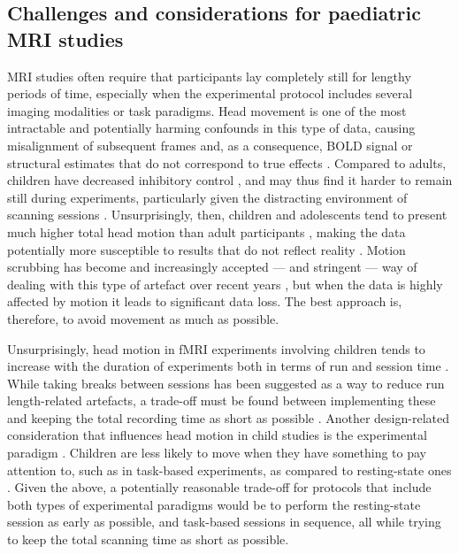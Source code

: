 \subsection{Challenges and considerations for paediatric MRI studies}


MRI studies often require that participants lay completely still for lengthy periods of time, especially when the experimental protocol includes several imaging modalities or task paradigms. Head movement is one of the most intractable and potentially harming confounds in this type of data, causing misalignment of subsequent frames and, as a consequence, BOLD signal or structural estimates that do not correspond to true effects \citep{Friston1996,Siegel2017}. Compared to adults, children have decreased inhibitory control \citep{Bedard2002}, and may thus find it harder to remain still during experiments, particularly  given the distracting environment of scanning sessions \citep{Greene2016}. Unsurprisingly, then, children and adolescents tend to present much higher total head motion than adult participants \citep{Satterthwaite2013b}, making the data potentially more susceptible to results that do not reflect reality \citep{Power2012}. Motion scrubbing has become and increasingly accepted --- and stringent --- way of dealing with this type of artefact over recent years \citep{Power2014a,Laumann2016}, but when the data is highly affected by motion it leads to significant data loss. The best approach is, therefore, to avoid movement as much as possible.

Unsurprisingly, head motion in fMRI experiments involving children tends to increase with the duration of experiments both in terms of run and session time \citep{Engelhardt2017}. While taking breaks between sessions has been suggested as a way to reduce run length-related artefacts, a trade-off must be found between implementing these and keeping the total recording time as short as possible \citep{Meissner2019}.  Another design-related consideration that influences head motion in child studies is the experimental paradigm \citep{Yuan2009a}. Children are less likely to move when they have something to pay attention to, such as in task-based experiments, as compared to resting-state ones \citep{Engelhardt2017}. Given the above, a potentially reasonable trade-off for protocols that include both types of experimental paradigms would be to perform the resting-state session as early as possible, and task-based sessions in sequence, all while trying to keep the total scanning time as short as possible. 


